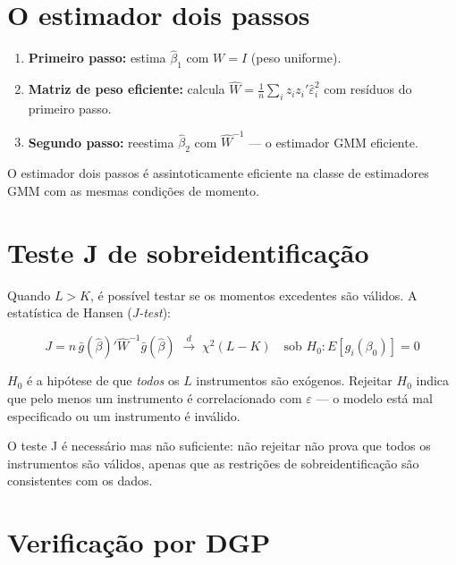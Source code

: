 \section{O estimador dois passos}

\begin{enumerate}
  \item \textbf{Primeiro passo:} estima $\hat\beta_1$ com $W = I$ (peso
        uniforme).
  \item \textbf{Matriz de peso eficiente:} calcula $\hat W = \tfrac{1}{n}
        \sum_i z_i z_i' \hat\varepsilon_i^2$ com resíduos do primeiro passo.
  \item \textbf{Segundo passo:} reestima $\hat\beta_2$ com $\hat W^{-1}$ —
        o estimador GMM eficiente.
\end{enumerate}

O estimador dois passos é assintoticamente eficiente na classe de estimadores
GMM com as mesmas condições de momento.

\section{Teste J de sobreidentificação}

Quando $L > K$, é possível testar se os momentos excedentes são válidos.
A estatística de Hansen (\emph{J-test}):

\[
  J = n\, \bar g(\hat\beta)' \hat W^{-1} \bar g(\hat\beta)
  \;\xrightarrow{d}\; \chi^2(L - K)
  \quad \text{sob } H_0: E[g_i(\beta_0)] = 0
\]

$H_0$ é a hipótese de que \emph{todos} os $L$ instrumentos são exógenos.
Rejeitar $H_0$ indica que pelo menos um instrumento é correlacionado com
$\varepsilon$ — o modelo está mal especificado ou um instrumento é inválido.

\begin{aviso}
  O teste J é necessário mas não suficiente: não rejeitar não prova que todos
  os instrumentos são válidos, apenas que as restrições de sobreidentificação
  são consistentes com os dados.
\end{aviso}

\section{Verificação por DGP}

